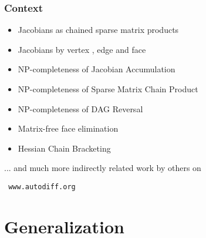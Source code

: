 \documentclass[ucs,10pt]{beamer}
\begin{document}
\begin{frame}
\frametitle{Context}

	\begin{itemize}
		\item Jacobians as chained sparse matrix products \cite{Griewank2003AJa}
		\item Jacobians by vertex \cite{Griewank1991OtC}, edge \cite{Naumann2002Etf} and face
			\cite{Naumann2004Oao}
		\item NP-completeness of {\sc Jacobian Accumulation} \cite{Naumann2008OJa,Naumann2023Ano}
		\item NP-completeness of {\sc Sparse Matrix Chain Product} \cite{Naumann2020Osm}
		\item NP-completeness of {\sc DAG Reversal} \cite{Naumann2008DRi,Naumann2008CTR}
		\item \textcolor{rwth-blue}{Matrix-free face elimination} \cite{Naumann2023ETf}
		\item Hessian Chain Bracketing \cite{Naumann2023HCB}
	\end{itemize}
	\vfill
... and much more indirectly related work by others on
	\begin{center}
		\color{purple}
		\large
		\tt
		www.autodiff.org
	\end{center}
\end{frame}

\section{Generalization}
\end{document}

